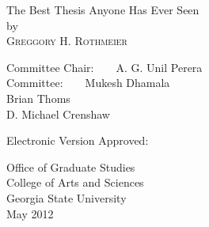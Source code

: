 \thispagestyle{empty}
\vspace*{\fill}
\begin{center}
  { \huge The Best Thesis Anyone Has Ever Seen } \\
  \vspace{1.0in}
  by \\
  \vspace{1.0in}
  { \large \textsc{Greggory H. Rothmeier} } \\
  \vspace{1.0in}
\end{center}
\begin{flushright}
  \begin{doublespace}
    Committee Chair:~~~~A. G. Unil Perera \\
    Committee:~~~~Mukesh Dhamala \\
                 Brian Thoms \\
                 D. Michael Crenshaw \\
  \end{doublespace}
\end{flushright}
\vspace{0.5in}
\begin{flushleft}
  Electronic Version Approved: \\
  \vspace{0.5in}
  \begin{doublespace}
    Office of Graduate Studies\\
    College of Arts and Sciences\\
    Georgia State University\\
    May 2012\\
  \end{doublespace}
\end{flushleft}

\vspace*{\fill}
